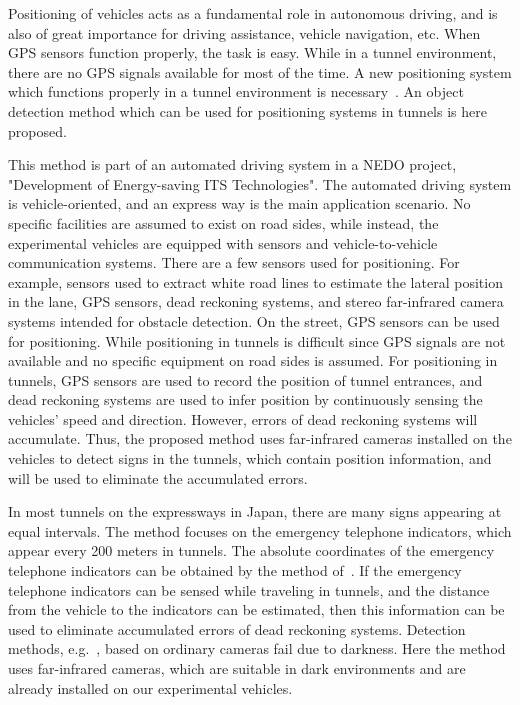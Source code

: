 Positioning of vehicles acts as a fundamental role in autonomous driving, and is also of great importance for driving assistance, vehicle navigation, etc. When GPS sensors function properly, the task is easy. While in a tunnel environment, there are no GPS signals available for most of the time. A new positioning system which functions properly in a tunnel environment is necessary~\citep{nig}. An object detection method which can be used for positioning systems in tunnels is here proposed.

This method is part of an automated driving system in a NEDO project, "Development of Energy-saving ITS Technologies".
The automated driving system is vehicle-oriented, and an express way is the main application scenario. No specific facilities are assumed to exist on road sides, while instead, the experimental vehicles are equipped with  sensors and vehicle-to-vehicle communication systems. There are a few sensors used for positioning. For example, sensors used to extract white road lines to estimate the lateral position in the lane, GPS sensors, dead reckoning systems, and stereo far-infrared camera systems intended for obstacle detection. On the street, GPS sensors can be used for positioning. While positioning in tunnels is difficult since GPS signals are not available and no specific equipment on road sides is assumed. For positioning in tunnels, GPS sensors are used to record the position of  tunnel entrances, and dead reckoning systems are used to infer position by continuously sensing the vehicles' speed and direction. However, errors of dead reckoning systems will accumulate. Thus, the proposed method uses far-infrared cameras installed on the vehicles to detect signs in the tunnels, which contain position information, and will be used to eliminate the accumulated errors.

In most tunnels   on the expressways in Japan, there are many signs appearing at equal intervals. The method focuses on the emergency telephone indicators, which appear every 200 meters in tunnels. The absolute coordinates of the emergency telephone indicators can be obtained by the method of~\citep{xue}.  If the emergency telephone indicators can be sensed while traveling in tunnels, and the distance from the vehicle to the indicators can be estimated,  then this information  can be used to eliminate accumulated errors of dead reckoning systems.
Detection methods, e.g.~\citep{ac23}, based on ordinary cameras fail due to darkness. Here the method uses far-infrared cameras,  which are suitable in dark environments and are already installed on our experimental vehicles.

